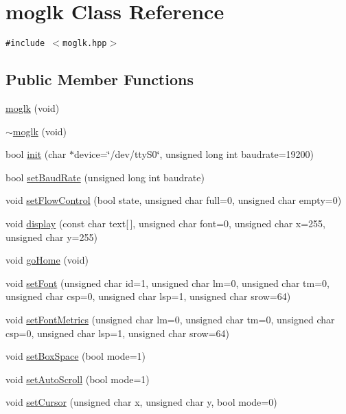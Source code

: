 \hypertarget{classmoglk}{
\section{moglk Class Reference}
\label{classmoglk}
}
{\tt \#include $<$moglk.hpp$>$}

\subsection*{Public Member Functions}
\begin{CompactItemize}
\item 
\hyperlink{classmoglk_3f753134676c7d36a96e6d4439cc0348}{moglk} (void)
\item 
\hyperlink{classmoglk_19ba0cf0910a364b32685b1806a98773}{$\sim$moglk} (void)
\item 
bool \hyperlink{classmoglk_2b26bc8f68f3b4efcac9d1e6d902b695}{init} (char $\ast$device=\char`\"{}/dev/ttyS0\char`\"{}, unsigned long int baudrate=19200)
\item 
bool \hyperlink{classmoglk_788fca7601af41bd23d2f310ecc34100}{setBaudRate} (unsigned long int baudrate)
\item 
void \hyperlink{classmoglk_09137664a708707066b2705b3a6d6894}{setFlowControl} (bool state, unsigned char full=0, unsigned char empty=0)
\item 
void \hyperlink{classmoglk_cf30cd08a2e1434e68b386236f4060bd}{display} (const char text\mbox{[}$\,$\mbox{]}, unsigned char font=0, unsigned char x=255, unsigned char y=255)
\item 
void \hyperlink{classmoglk_1f33a99d62509dfd98ca6898ba5a228e}{goHome} (void)
\item 
void \hyperlink{classmoglk_cfb8813e8db8de6ef0f34e479952589b}{setFont} (unsigned char id=1, unsigned char lm=0, unsigned char tm=0, unsigned char csp=0, unsigned char lsp=1, unsigned char srow=64)
\item 
void \hyperlink{classmoglk_17c4f023df63951df9f19f08c56f8786}{setFontMetrics} (unsigned char lm=0, unsigned char tm=0, unsigned char csp=0, unsigned char lsp=1, unsigned char srow=64)
\item 
void \hyperlink{classmoglk_ad564fea38cd80622152c152bfe62f4e}{setBoxSpace} (bool mode=1)
\item 
void \hyperlink{classmoglk_38e9c9bda5fbe192d696ae67246c0bef}{setAutoScroll} (bool mode=1)
\item 
void \hyperlink{classmoglk_15e0fbeefcab8874138e8865c53e204c}{setCursor} (unsigned char x, unsigned char y, bool mode=0)

\end{CompactItemize}
